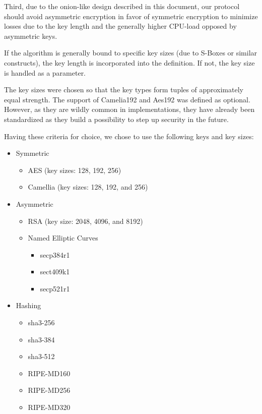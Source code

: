 Third, due to the onion-like design described in this document, our protocol should avoid asymmetric encryption in favor of symmetric encryption to minimize losses due to the key length and the generally higher CPU-load opposed by asymmetric keys.

If the algorithm is generally bound to specific key sizes (due to S-Boxes or similar constructs), the key length is incorporated into the definition. If not, the key size is handled as a parameter.

The key sizes were chosen so that the key types form tuples of approximately equal strength. The support of Camelia192 and Aes192 was defined as optional. However, as they are wildly common in implementations, they have already been standardized as they build a possibility to step up security in the future.

Having these criteria for choice, we chose to use the following keys and key sizes:
\begin{itemize}
	\item Symmetric
	\begin{itemize}
		\item AES (key sizes: 128, 192, 256)
		\item Camellia (key sizes: 128, 192, and 256)
	\end{itemize}
	\item Asymmetric
	\begin{itemize}
		\item RSA (key size: 2048, 4096, and 8192)
		\item Named Elliptic Curves
		\begin{itemize}
			\item secp384r1
			\item sect409k1
			\item secp521r1
		\end{itemize}
	\end{itemize}
	\item Hashing
	\begin{itemize}
		\item sha3-256
		\item sha3-384
		\item sha3-512
		\item RIPE-MD160
		\item RIPE-MD256
		\item RIPE-MD320
	\end{itemize}
\end{itemize}

